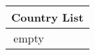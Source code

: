\documentclass[preview]{standalone}
\begin{document}
\begin{center}
\begin{tabular}{|c c c c|}
\hline
\multicolumn{4}{|c|}{Country List} \\
\hline
empty
\end{tabular}
\end{center}
\end{document}

